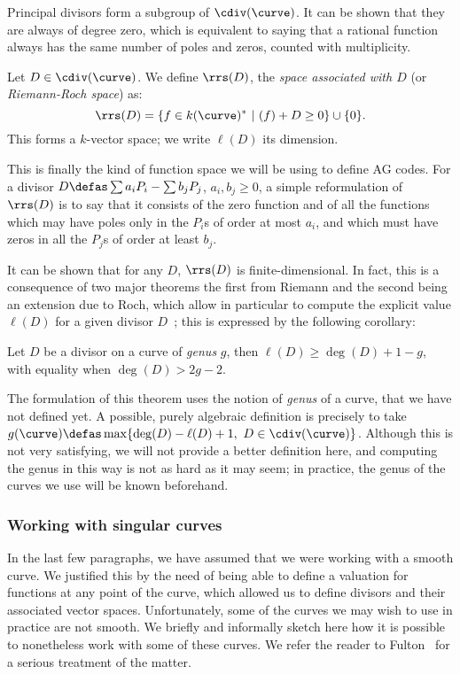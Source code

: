 Principal divisors form a subgroup of $\cdiv(\curve)$. It can be shown that they are always of degree zero, which
is equivalent to saying that a rational function always has the same number of poles and zeros, counted with
multiplicity.

\begin{defi}
Let $D \in \cdiv(\curve)$. We define $\rrs(D)$, the \emph{space associated with $D$} (or \emph{Riemann-Roch space}) as:
\[
\rrs(D) = \{f \in k(\curve)^*~|~(f) + D \geq 0\} \cup \{0\}.
\]
This forms a $k$-vector space; we write $\ell(D)$ its dimension.
\end{defi}

This is finally the kind of function space we will be using to define AG codes. For a divisor
$D \defas \sum a_iP_i - \sum b_jP_j$, $a_i, b_j \geq 0$, a simple reformulation of $\rrs(D)$ is to say that it consists of the zero function and of all the functions
which may have poles only in the $P_i$s of order at most $a_i$, and which must have zeros in all the $P_j$s of order
at least $b_j$.

It can be shown that for any $D$, $\rrs(D)$ is finite-dimensional. In fact, this is a consequence of two major theorems
the first from Riemann and the second being an extension due to Roch, which allow in particular to compute the explicit value $\ell(D)$
for a given divisor $D$~; this is expressed by the following corollary:

\begin{cor}
Let $D$ be a divisor on a curve of \emph{genus} $g$, then $\ell(D) \geq \deg(D) + 1 - g$, with equality
when $\deg(D) > 2g - 2$.
\end{cor}

The formulation of this theorem uses the notion of \emph{genus} of a curve, that we have not defined yet. A possible, purely algebraic definition is precisely to take
$g(\curve) \defas \max \{\deg(D) - \ell(D) + 1,~D \in \cdiv(\curve)\}$. Although this is not very satisfying, we will not provide a better definition here, and computing
the genus in this way is not as hard as it may seem; in practice, the genus
of the curves we use will be known beforehand.

\subsubsection{Working with singular curves}
\label{sec:nonsingmod}

In the last few paragraphs, we have assumed that we were working with a smooth curve. We justified this by the need of being able to define a valuation for functions
at any point of the curve, which allowed us to define divisors and their associated vector spaces.
Unfortunately, some of the curves we may wish to use in practice are not smooth. We briefly and informally sketch here how it is possible to nonetheless work with some
of these curves. We refer the reader to \eg Fulton~\cite[Chap. 7]{fulton} for a serious treatment of the matter.

